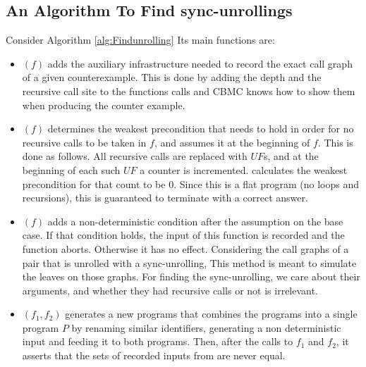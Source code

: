\subsection{An Algorithm To Find sync-unrollings}
Consider Algorithm \ref{alg:Findunrolling} Its main functions are: 
\begin{itemize}
    \item {}$(f)$ adds the auxiliary infrastructure needed to record the exact call graph of a given counterexample. This is done by adding the depth and the recursive call site to the functions calls and CBMC knows how to show them when producing the counter example.
    \item {}$(f)$ determines the weakest precondition that needs to hold in order for no recursive calls to be taken in $f$, and assumes it at the beginning of $f$. This is done as follows. All recursive calls are replaced with $UF$s, and at the beginning of each such $UF$ a counter is incremented.  calculates the weakest precondition for that count to be 0. Since this is a flat program (no loops and recursions), this is guaranteed to terminate with a correct answer.
    \item {}$(f)$ adds a non-deterministic condition after the assumption on the base case. If that condition holds, the input of this function is recorded and the function aborts. Otherwise it has no effect. Considering the call graphs of a pair that is unrolled with a sync-unrolling, This method is meant to simulate the leaves on those graphs. For finding the sync-unrolling, we care about their arguments, and whether they had recursive calls or not is irrelevant. 
    \item {}$(f_1,f_2)$ generates a new programs that combines the programs into a single program $P$ by renaming similar identifiers, generating a non deterministic input and feeding it to both programs. Then, after the calls to $f_1$ and $f_2$, it asserts that the sets of recorded inputs from  are never equal. 

\end{itemize}
